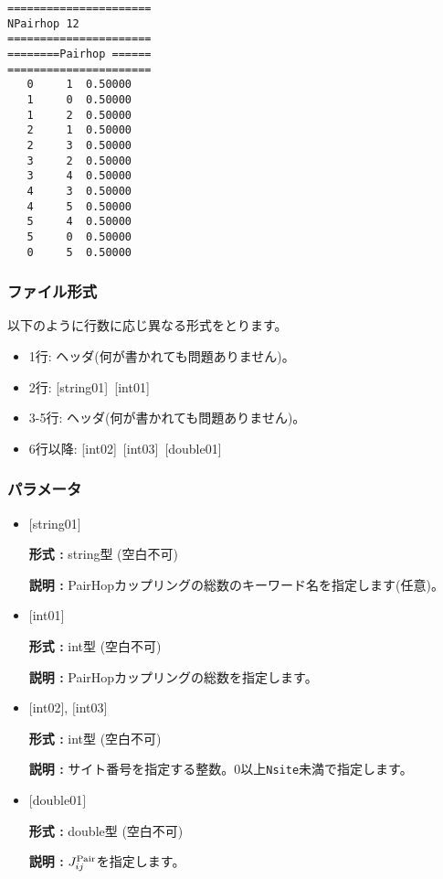 \begin{minipage}{12.5cm}
\begin{screen}
\begin{verbatim}
====================== 
NPairhop 12  
====================== 
========Pairhop ====== 
====================== 
   0     1  0.50000
   1     0  0.50000  
   1     2  0.50000
   2     1  0.50000
   2     3  0.50000
   3     2  0.50000
   3     4  0.50000
   4     3  0.50000
   4     5  0.50000
   5     4  0.50000
   5     0  0.50000
   0     5  0.50000
\end{verbatim}
\end{screen}
\end{minipage}

\subsubsection{ファイル形式}
以下のように行数に応じ異なる形式をとります。
 \begin{itemize}
   \item  1行:  ヘッダ(何が書かれても問題ありません)。
   \item  2行:   [string01]~[int01]
   \item  3-5行:  ヘッダ(何が書かれても問題ありません)。
   \item  6行以降:
   [int02]~[int03]~[double01] 
  \end{itemize}
\subsubsection{パラメータ}
 \begin{itemize}

   \item  $[$string01$]$
   
    {\bf 形式 :} string型 (空白不可)

   {\bf 説明 :} PairHopカップリングの総数のキーワード名を指定します(任意)。

   \item  $[$int01$]$
   
    {\bf 形式 :} int型 (空白不可)

   {\bf 説明 :} PairHopカップリングの総数を指定します。

  \item  $[$int02$]$, $[$int03$]$
  
 {\bf 形式 :} int型 (空白不可)

{\bf 説明 :} サイト番号を指定する整数。0以上\verb|Nsite|{未満}で指定します。
 
 \item  $[$double01$]$
   
   {\bf 形式 :} double型 (空白不可)

  {\bf 説明 :}  $J_{ij}^{\rm Pair}$を指定します。
  
\end{itemize}

